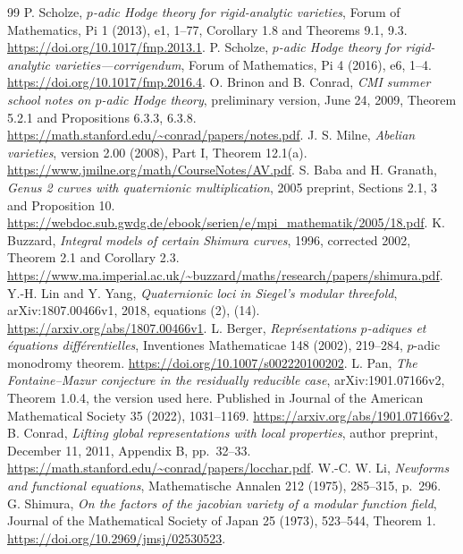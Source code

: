 \documentclass[11pt]{article}
\theoremstyle{definition}
\theoremstyle{remark}
\begin{document}
\begin{thebibliography}{99}
 P. Scholze,
\emph{$p$-adic Hodge theory for rigid-analytic varieties},
Forum of Mathematics, Pi 1 (2013), e1, 1--77,
Corollary 1.8 and Theorems 9.1, 9.3.
\url{https://doi.org/10.1017/fmp.2013.1}.
 P. Scholze,
\emph{$p$-adic Hodge theory for rigid-analytic varieties---corrigendum},
Forum of Mathematics, Pi 4 (2016), e6, 1--4.
\url{https://doi.org/10.1017/fmp.2016.4}.
 O. Brinon and B. Conrad,
\emph{CMI summer school notes on $p$-adic Hodge theory},
preliminary version, June 24, 2009,
Theorem 5.2.1 and Propositions 6.3.3, 6.3.8.
\url{https://math.stanford.edu/~conrad/papers/notes.pdf}.
 J. S. Milne, \emph{Abelian varieties},
version 2.00 (2008), Part I, Theorem 12.1(a).
\url{https://www.jmilne.org/math/CourseNotes/AV.pdf}.
 S. Baba and H. Granath,
\emph{Genus 2 curves with quaternionic multiplication}, 2005 preprint,
Sections 2.1, 3 and Proposition 10.
\url{https://webdoc.sub.gwdg.de/ebook/serien/e/mpi_mathematik/2005/18.pdf}.
 K. Buzzard, \emph{Integral models of certain Shimura
curves}, 1996, corrected 2002, Theorem 2.1 and Corollary 2.3.
\url{https://www.ma.imperial.ac.uk/~buzzard/maths/research/papers/shimura.pdf}.
 Y.-H. Lin and Y. Yang, \emph{Quaternionic loci in
Siegel's modular threefold}, arXiv:1807.00466v1, 2018, equations (2), (14).
\url{https://arxiv.org/abs/1807.00466v1}.
 L. Berger, \emph{Repr\'esentations $p$-adiques et
\'equations diff\'erentielles}, Inventiones Mathematicae 148 (2002),
219--284, $p$-adic monodromy theorem.
\url{https://doi.org/10.1007/s002220100202}.
 L. Pan, \emph{The Fontaine--Mazur conjecture in the
residually reducible case}, arXiv:1901.07166v2,
Theorem 1.0.4, the version used here. Published in Journal of the
American Mathematical Society 35 (2022), 1031--1169.
\url{https://arxiv.org/abs/1901.07166v2}.
 B. Conrad,
\emph{Lifting global representations with local properties},
author preprint, December 11, 2011, Appendix B, pp.~32--33.
\url{https://math.stanford.edu/~conrad/papers/locchar.pdf}.
 W.-C. W. Li,
\emph{Newforms and functional equations}, Mathematische Annalen
212 (1975), 285--315, p.~296.
 G. Shimura,
\emph{On the factors of the jacobian variety of a modular function field},
Journal of the Mathematical Society of Japan 25 (1973), 523--544,
Theorem 1.
\url{https://doi.org/10.2969/jmsj/02530523}.

\end{thebibliography}
\end{document}
